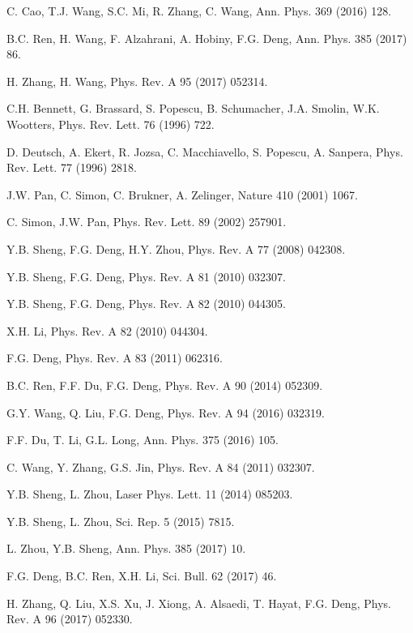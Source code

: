 \documentclass[preprintnumbers,showkeys,amsmath,amssymb]{revtex4}%
\begin{document}
\begin{thebibliography}{1}
 C. Cao, T.J. Wang, S.C. Mi, R. Zhang, C. Wang, Ann. Phys. 369 (2016) 128.

 B.C. Ren, H. Wang, F. Alzahrani, A. Hobiny,
F.G. Deng, Ann. Phys. 385 (2017) 86.

 H. Zhang, H. Wang, Phys. Rev. A 95 (2017) 052314.


 C.H. Bennett, G. Brassard, S. Popescu, B. Schumacher, J.A. Smolin, W.K. Wootters, Phys. Rev. Lett. 76 (1996) 722.

 D. Deutsch, A. Ekert, R. Jozsa, C. Macchiavello, S. Popescu, A. Sanpera, Phys. Rev. Lett. 77 (1996) 2818.

 J.W. Pan, C. Simon, C. Brukner, A. Zelinger, Nature 410 (2001) 1067.

 C. Simon, J.W. Pan, Phys. Rev. Lett. 89 (2002) 257901.

 Y.B. Sheng, F.G. Deng, H.Y. Zhou, Phys. Rev. A 77 (2008) 042308.

 Y.B. Sheng, F.G. Deng, Phys. Rev. A 81 (2010) 032307.

 Y.B. Sheng, F.G. Deng, Phys. Rev. A 82 (2010) 044305.

X.H. Li, Phys. Rev. A 82 (2010) 044304.

 F.G. Deng, Phys. Rev. A 83 (2011) 062316.

 B.C. Ren, F.F. Du, F.G. Deng, Phys. Rev. A 90 (2014) 052309.

 G.Y. Wang, Q. Liu, F.G. Deng, Phys. Rev. A 94 (2016) 032319.

 F.F. Du, T. Li,  G.L. Long, Ann. Phys.  375   (2016) 105.

 C. Wang, Y. Zhang, G.S. Jin, Phys. Rev. A 84 (2011) 032307.

 Y.B. Sheng, L. Zhou, Laser Phys. Lett. 11 (2014) 085203.

 Y.B. Sheng, L. Zhou, Sci. Rep. 5 (2015) 7815.

 L. Zhou, Y.B. Sheng, Ann. Phys. 385 (2017) 10.

F.G. Deng, B.C.  Ren,  X.H. Li,  Sci. Bull. 62
(2017) 46.

 H. Zhang, Q. Liu, X.S. Xu, J. Xiong, A.
Alsaedi, T. Hayat, F.G. Deng, Phys. Rev. A 96 (2017) 052330.



\end{thebibliography}
\end{document}
